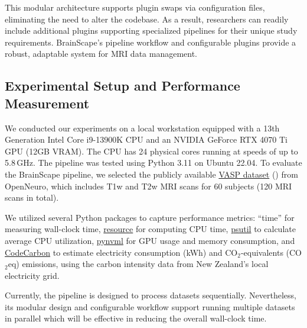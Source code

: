 This modular architecture supports plugin swaps via configuration files, 
eliminating the need to alter the codebase. As a result, researchers can 
readily include additional plugins supporting specialized pipelines for their unique study requirements. 
BrainScape's pipeline workflow and configurable plugins provide a robust, adaptable system for MRI data management.


\subsection{Experimental Setup and Performance Measurement}

We conducted our experiments on a local workstation equipped with a 13th Generation Intel Core i9-13900K CPU 
and an NVIDIA GeForce RTX 4070 Ti GPU (12GB VRAM). 
The CPU has 24 physical cores running at speeds of up to 5.8\,GHz. 
The pipeline was tested using Python 3.11 on Ubuntu 22.04.
To evaluate the BrainScape pipeline, 
we selected the publicly available \href{https://openneuro.org/datasets/ds003717}{VASP dataset} (\cite{peelle2022increased}) from OpenNeuro, 
which includes T1w and T2w MRI scans for 60 subjects (120 MRI scans in total). 

We utilized several Python packages to capture performance metrics: 
``time'' for measuring wall-clock time, 
\href{https://docs.python.org/3/library/resource.html}{resource} for computing CPU time,
\href{https://pypi.org/project/psutil/}{psutil} to calculate average CPU utilization, 
\href{https://pypi.org/project/pynvml/}{pynvml} for GPU usage and memory consumption, and 
\href{https://pypi.org/project/codecarbon/}{CodeCarbon} to estimate electricity consumption (kWh) and CO$_2$-equivalents (CO$_2$eq) emissions, 
using the carbon intensity data from New Zealand's local electricity grid.

Currently, the pipeline is designed to process datasets sequentially. 
Nevertheless, its modular design and configurable workflow support running multiple datasets in parallel 
which will be effective in reducing the overall wall-clock time.


